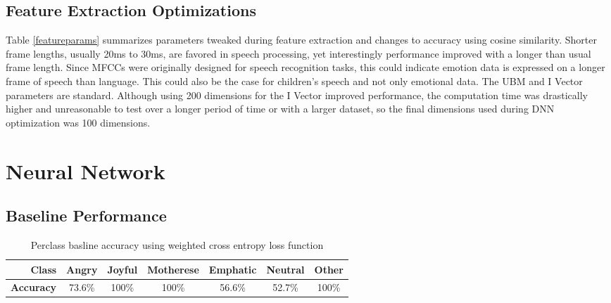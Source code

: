 	 \subsection{Feature Extraction Optimizations}
	 Table \ref{featureparams} summarizes parameters tweaked during feature extraction and changes to accuracy using cosine similarity. Shorter frame lengths, usually 20ms to 30ms, are favored in speech processing, yet interestingly performance improved with a longer than usual frame length. Since MFCCs were originally designed for speech recognition tasks, this could indicate emotion data is expressed on a longer frame of speech than language. This could also be the case for children's speech and not only emotional data. The UBM and I Vector parameters are standard. Although using 200 dimensions for the I Vector improved performance, the computation time was drastically higher and unreasonable to test over a longer period of time or with a larger dataset, so the final dimensions used during DNN optimization was 100 dimensions.
	 
	 \section{Neural Network}
	 \subsection{Baseline Performance}
	 \begin{table}[!hbt]
	 	\centering
	 	\caption{Perclass basline accuracy using weighted cross entropy loss function}
	 	\begin{tabular}{|r|c|c|c|c|c|c|}
	 		\hline
	 		\textbf{Class}    & Angry  & Joyful & Motherese & Emphatic & Neutral & Other \\ \hline
	 		\textbf{Accuracy} & 73.6\% & 100\%  & 100\%     & 56.6\%   & 52.7\%  & 100\% \\ \hline
	 	\end{tabular}
 	\label{perclass}
	 \end{table}
